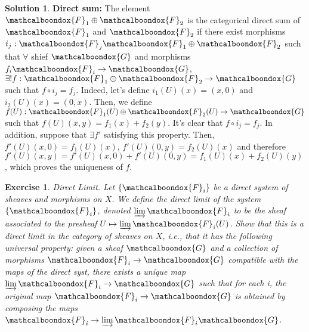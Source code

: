 \documentclass[12pt]{article}
\newtheorem{ex}{Exercise}[section]
\theoremstyle{definition}
\newtheorem*{sol}{Solution}
\newcommand{\sF}{\ensuremath{\mathcalboondox{F}}}
\newcommand{\sG}{\ensuremath{\mathcalboondox{G}}}
\begin{document}
\begin{sol}
	\textbf{Direct sum:} The element $\sF_1 \oplus \sF_2$ is the categorical direct sum of $\sF_1$ and $\sF_2$ if there exist morphisms $i_j: \sF_j \sF_1 \oplus \sF_2$ such that $\forall$ shief $\sG$ and morphisms $f_i \sF_i \to \sG$, $\exists ! f: \sF_1 \oplus \sF_2 \to \sG$ such that $f \circ i_j = f_j$. Indeed, let's define $i_1(U)(x) = (x,0)$ and $i_2(U)(x) = (0,x)$. Then, we define $f(U): \sF_1(U) \oplus \sF_2(U) \to \sG$ such that $f(U)(x,y) = f_1(x) + f_2(y)$. It's clear that $f \circ i_j = f_j$. In addition, suppose that $\exists f'$ satisfying this property. Then, $f'(U)(x,0) = f_1(U)(x)$, $f'(U)(0,y) = f_2(U)(x)$ and therefore $f'(U)(x,y) = f'(U)(x,0) + f'(U)(0,y) = f_1(U)(x) + f_2(U)(y)$, which proves the uniqueness of $f$.
\end{sol}

\begin{ex}
	Direct Limit. Let $\{\sF_i\}$ be a direct system of sheaves and morphisms on $X$. We define the direct limit of the system $\{\sF_i\}$, denoted $\varinjlim \sF_i$ to be the sheaf associated to the presheaf $U \mapsto \varinjlim \sF_i(U)$. Show that this is a direct limit in the category of sheaves on $X$, i.e., that it has the following universal property: given a sheaf $\sG$ and a collection of morphisms $\sF_i \to \sG$ compatible with the maps of the direct syst, there exists a unique map $\varinjlim \sF_i \to \sG$ such that for each i, the original map $\sF_i \to \sG$ is obtained by composing the maps $\sF_i \to \varinjlim \sF_i \sG$.
\end{ex}
\end{document}
